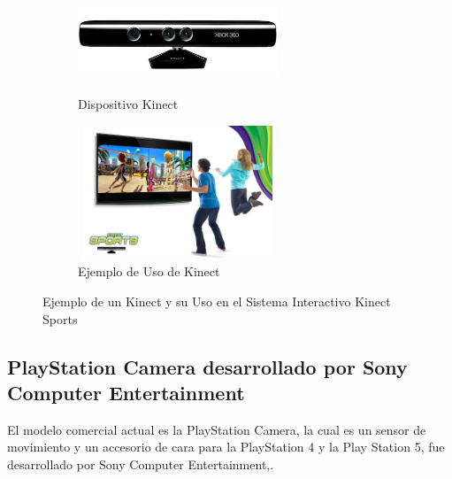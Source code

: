 \begin{figure}
	\centering
	\begin{subfigure}{.5\textwidth}
		\centering
		\includegraphics[width=6cm,height=3cm,]{./Images/kinectex.jpg}
		\caption{Dispositivo Kinect}
		\label{kinectex}
	\end{subfigure}%
	\begin{subfigure}{0.5\textwidth}
		\centering
		\includegraphics[width=6cm,height=4cm,]{./Images/kinectexuse.jpg}
		\caption{Ejemplo de Uso de Kinect}
		\label{kinectexuse}
	\end{subfigure}
	\caption{Ejemplo de un Kinect y su Uso en el Sistema Interactivo Kinect Sports}
	\label{kinectExample}
\end{figure}

\subsection{PlayStation Camera desarrollado por Sony Computer Entertainment}

El modelo comercial actual es la PlayStation Camera, la cual es un sensor de movimiento y un accesorio de cara para la PlayStation 4 y la Play Station 5, fue desarrollado por Sony Computer Entertainment,.

